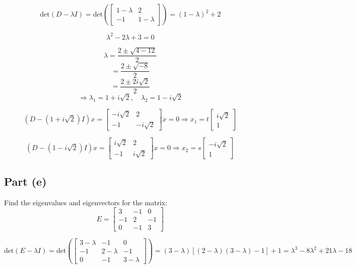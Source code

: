 \documentclass[12pt]{article}
\begin{document}
\[
\text{det}(D - \lambda I) = \text{det}\left(\begin{bmatrix} 1-\lambda & 2 \\ -1 & 1-\lambda \end{bmatrix}\right) = (1-\lambda)^2 + 2
\]

\[
\lambda^2 - 2\lambda + 3 = 0
\]

\[
\lambda = \frac{2 \pm \sqrt{4 - 12}}{2}
\]
\[
= \frac{2 \pm \sqrt{-8}}{2}
\]
\[
= \frac{2 \pm 2i\sqrt{2}}{2}
\]
\[
\Rightarrow \lambda_1 = 1 + i\sqrt{2}, \quad \lambda_2 = 1 - i\sqrt{2}
\]

\[
(D - (1 + i\sqrt{2})I)x = \begin{bmatrix} -i\sqrt{2} & 2 \\ -1 & -i\sqrt{2} \end{bmatrix}x = 0 \Rightarrow x_1 = t\begin{bmatrix} i\sqrt{2} \\ 1 \end{bmatrix}
\]

\[
(D - (1 - i\sqrt{2})I)x = \begin{bmatrix} i\sqrt{2} & 2 \\ -1 & i\sqrt{2} \end{bmatrix}x = 0 \Rightarrow x_2 = s\begin{bmatrix} -i\sqrt{2} \\ 1 \end{bmatrix}
\]

\pagebreak

\subsection*{Part (e)}
Find the eigenvalues and eigenvectors for the matrix:
\[
  E = \begin{bmatrix} 3 & -1 & 0 \\ -1 & 2 & -1 \\ 0 & -1 & 3 \end{bmatrix}
\]

\[
  \text{det}(E - \lambda I) = \text{det}\left(\begin{bmatrix} 3-\lambda & -1 & 0 \\ -1 & 2-\lambda & -1 \\ 0 & -1 & 3-\lambda \end{bmatrix}\right) = (3-\lambda)[(2-\lambda)(3-\lambda) - 1] + 1 = \lambda^3 - 8\lambda^2 + 21\lambda - 18
\]
\end{document}
